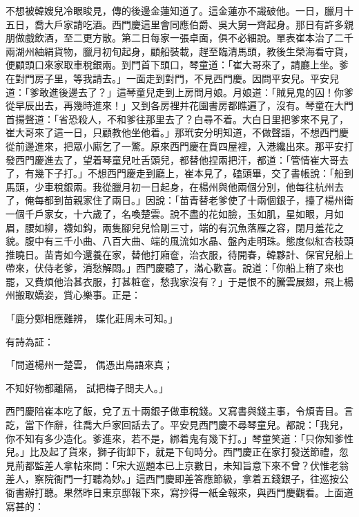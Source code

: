 不想被韓嫂兒冷眼睃見，傳的後邊金蓮知道了。這金蓮亦不識破他。一日，臘月十五日，喬大戶家請吃酒。西門慶這里會同應伯爵、吳大舅一齊起身。那日有許多親朋做戲飲酒，至二更方散。第二日每家一張卓面，俱不必細說。單表崔本治了二千兩湖州紬絹貨物，臘月初旬起身，顧船裝載，趕至臨清馬頭，教後生榮海看守貨，便顧頭口來家取車稅銀兩。到門首下頭口，琴童道：「崔大哥來了，請廳上坐。爹在對門房子里，等我請去。」一面走到對門，不見西門慶。因問平安兒。平安兒道：「爹敢進後邊去了？」這琴童兒走到上房問月娘。月娘道：「賊見鬼的囚！你爹從早辰出去，再幾時進來！」又到各房裡并花園書房都瞧遍了，沒有。琴童在大門首揚聲道：「省恐殺人，不和爹往那里去了？白尋不着。大白日里把爹來不見了，崔大哥來了這一日，只顧教他坐他着。」那玳安分明知道，不做聲語，不想西門慶從前邊進來，把眾小廝乞了一驚。原來西門慶在賁四屋裡，入港纔出來。那平安打發西門慶進去了，望着琴童兒吐舌頭兒，都替他捏兩把汗，都道：「管情崔大哥去了，有幾下子打。」不想西門慶走到廳上，崔本見了，磕頭畢，交了書帳說：「船到馬頭，少車稅銀兩。我從臘月初一日起身，在楊州與他兩個分別，他每往杭州去了，俺每都到苗親家住了兩日。」因說：「苗青替老爹使了十兩個銀子，擡了楊州衛一個千戶家女，十六歲了，名喚楚雲。說不盡的花如臉，玉如肌，星如眼，月如眉，腰如柳，襪如鈎，兩隻腳兒兒恰剛三寸，端的有沉魚落雁之容，閉月羞花之貌。腹中有三千小曲、八百大曲、端的風流如水晶、盤內走明珠。態度似紅杏枝頭推曉日。苗青如今還養在家，替他打廂奩，治衣服，待開春，韓夥計、保官兒船上帶來，伏侍老爹，消愁解悶。」西門慶聽了，滿心歡喜。說道：「你船上稍了來也罷，又費煩他治甚衣服，打甚粧奩，愁我家沒有？」于是恨不的騰雲展翅，飛上楊州搬取嬌姿，賞心樂事。正是：

「鹿分鄭相應難辨，  蝶化莊周未可知。」

有詩為証：

「問道楊州一楚雲，  偶憑出鳥語來真；

不知好物都離隔，  試把梅子問夫人。」

西門慶陪崔本吃了飯，兌了五十兩銀子做車稅錢。又寫書與錢主事，令煩青目。言訖，當下作辭，往喬大戶家回話去了。平安見西門慶不尋琴童兒。都說：「我兒，你不知有多少造化。爹進來，若不是，綁着鬼有幾下打。」琴童笑道：「只你知爹性兒。」比及起了貨來，獅子街卸下，就是下旬時分。西門慶正在家打發送節禮，忽見荊都監差人拿帖來問：「宋大巡題本已上京數日，未知旨意下來不曾？伏惟老翁差人，察院衙門一打聽為妙。」這西門慶即差答應節級，拿着五錢銀子，往巡按公衙書辦打聽。果然昨日東京邸報下來，寫抄得一紙全報來，與西門慶觀看。上面道寫甚的：

